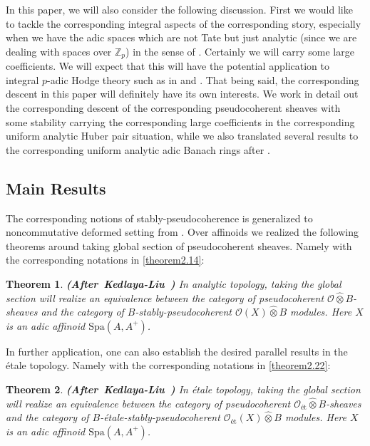 \documentclass[12pt]{amsart}
\newtheorem{theorem}{Theorem}[section]
\theoremstyle{definition}
\numberwithin{equation}{section}
\begin{document}
\indent In this paper, we will also consider the following discussion. First we would like to tackle the corresponding integral aspects of the corresponding story, especially when we have the adic spaces which are not Tate but just analytic (since we are dealing with spaces over $\mathbb{Z}_p$) in the sense of \cite{Ked2}. Certainly we will carry some large coefficients. We will expect that this will have the potential application to integral $p$-adic Hodge theory such as in \cite{BMS} and \cite{BS}. That being said, the corresponding descent in this paper will definitely have its own interests. We work in detail out the corresponding descent of the corresponding pseudocoherent sheaves with some stability carrying the corresponding large coefficients in the corresponding uniform analytic Huber pair situation, while we also translated several results to the corresponding uniform analytic adic Banach rings after \cite{KL2}. \\


\subsection{Main Results}


\indent  The corresponding notions of stably-pseudocoherence is generalized to noncommutative deformed setting from \cite{KL2}. Over affinoids we realized the following theorems around taking global section of pseudocoherent sheaves. Namely with the corresponding notations in \cref{theorem2.14}:


\begin{theorem}\mbox{\bf{(After Kedlaya-Liu \cite[Theorem 2.5.5]{KL2})}} In analytic topology, taking the global section will realize an equivalence between the category of pseudocoherent $\mathcal{O}\widehat{\otimes} B$-sheaves and the category of $B$-stably-pseudocoherent $\mathcal{O}(X)\widehat{\otimes}B$ modules. Here $X$ is an adic affinoid $\mathrm{Spa}(A,A^+)$. 
	
\end{theorem}

\indent In further application, one can also establish the desired parallel results in the \'etale topology. Namely with the corresponding notations in \cref{theorem2.22}:


\begin{theorem}\mbox{\bf{(After Kedlaya-Liu \cite[Theorem 2.5.14]{KL2})}} In \'etale topology, taking the global section will realize an equivalence between the category of pseudocoherent $\mathcal{O}_\text{\'et}\widehat{\otimes} B$-sheaves and the category of $B$-\'etale-stably-pseudocoherent $\mathcal{O}_\text{\'et}(X)\widehat{\otimes}B$ modules. Here $X$ is an adic affinoid $\mathrm{Spa}(A,A^+)$.  
	
\end{theorem}
\end{document}
